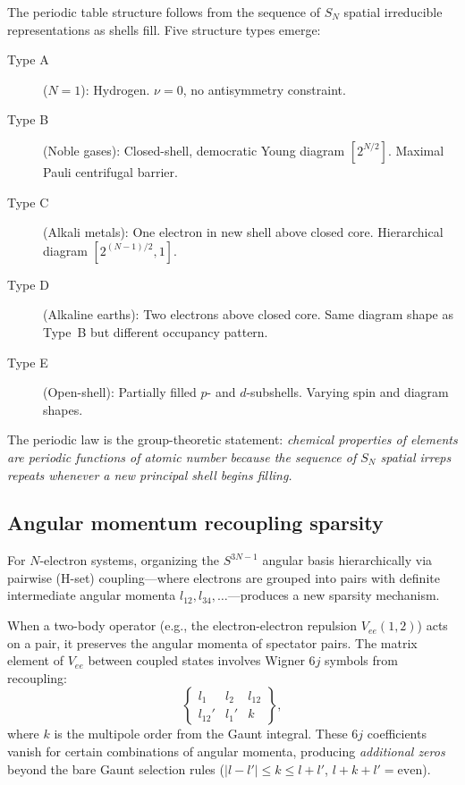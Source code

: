 \documentclass[aps,pra,twocolumn,superscriptaddress,longbibliography]{revtex4-2}
\begin{document}
The periodic table structure follows from the sequence of $S_N$ spatial
irreducible representations as shells fill.  Five structure types emerge:
\begin{description}
\item[Type A] ($N = 1$): Hydrogen.  $\nu = 0$, no antisymmetry
  constraint.
\item[Type B] (Noble gases): Closed-shell, democratic Young diagram
  $[2^{N/2}]$.  Maximal Pauli centrifugal barrier.
\item[Type C] (Alkali metals): One electron in new shell above closed
  core.  Hierarchical diagram $[2^{(N-1)/2}, 1]$.
\item[Type D] (Alkaline earths): Two electrons above closed core.
  Same diagram shape as Type~B but different occupancy pattern.
\item[Type E] (Open-shell): Partially filled $p$- and $d$-subshells.
  Varying spin and diagram shapes.
\end{description}

The periodic law is the group-theoretic statement: \textit{chemical
properties of elements are periodic functions of atomic number because
the sequence of $S_N$ spatial irreps repeats whenever a new principal
shell begins filling.}

\subsection{Angular momentum recoupling sparsity}

For $N$-electron systems, organizing the $S^{3N-1}$ angular basis
hierarchically via pairwise (H-set) coupling---where electrons are
grouped into pairs with definite intermediate angular momenta
$l_{12}, l_{34}, \ldots$---produces a new sparsity mechanism.

When a two-body operator (e.g., the electron-electron repulsion
$V_{ee}(1,2)$) acts on a pair, it preserves the angular momenta of
spectator pairs.  The matrix element of $V_{ee}$ between coupled states
involves Wigner 6$j$ symbols from recoupling:
\begin{equation}
\begin{Bmatrix} l_1 & l_2 & l_{12} \\ l_{12}' & l_1' & k \end{Bmatrix},
\label{eq:6j}
\end{equation}
where $k$ is the multipole order from the Gaunt integral.  These 6$j$
coefficients vanish for certain combinations of angular momenta,
producing \textit{additional zeros} beyond the bare Gaunt selection
rules ($|l - l'| \leq k \leq l + l'$, $l + k + l' = \text{even}$).
\end{document}
